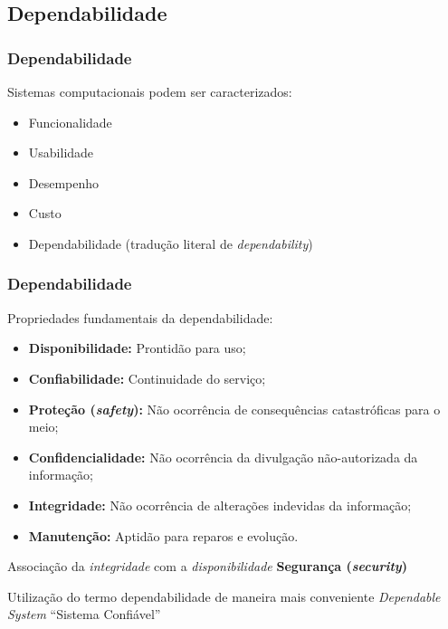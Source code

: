 \documentclass{beamer}
\begin{document}
\subsection{Dependabilidade}
\begin{frame}
    \frametitle{Dependabilidade}

    Sistemas computacionais podem ser caracterizados:

\begin{itemize}
    \item Funcionalidade
    \item Usabilidade
    \item Desempenho
    \item Custo
    \item \alert{Dependabilidade} (tradução literal de {\it dependability})
\end{itemize}

\end{frame}

\begin{frame}
    \frametitle{Dependabilidade}

    Propriedades fundamentais da dependabilidade:

\begin{itemize}
    \small
    \item {\bf Disponibilidade:} Prontidão para uso;
    \item {\bf Confiabilidade:} Continuidade do serviço;
    \item \textbf{Proteção (\textit{safety}):} Não ocorrência de consequências
          catastróficas para o meio;
    \item {\bf Confidencialidade:} Não ocorrência da divulgação não-autorizada
          da informação;
    \item {\bf Integridade:} Não ocorrência de alterações indevidas da
          informação;
    \item {\bf Manutenção:} Aptidão para reparos e evolução.
\end{itemize}

    Associação da {\it integridade} com a {\it disponibilidade} \implica \textbf
    {Segurança (\textit{security})}

    \vspace{0.25cm}

    Utilização do termo dependabilidade de maneira mais conveniente \implica
    {\it Dependable System} \implica ``Sistema Confiável''
\end{frame}
\end{document}
